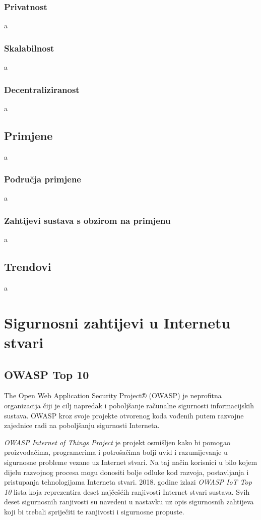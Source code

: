 \documentclass[times, utf8, diplomski]{fer}
\begin{document}
\subsection{Privatnost}
a

\subsection{Skalabilnost}
a

\subsection{Decentraliziranost}
a

\section{Primjene}
a

\subsection{Područja primjene}
a

\subsection{Zahtijevi sustava s obzirom na primjenu}
a

\section{Trendovi}
a


\chapter{Sigurnosni zahtijevi u Internetu stvari}

\section{OWASP Top 10}
The Open Web Application Security Project® (OWASP) je neprofitna organizacija čiji je cilj napredak i poboljšanje računalne sigurnosti informacijskih sustava. OWASP kroz svoje projekte otvorenog koda vođenih putem razvojne zajednice radi na poboljšanju sigurnosti Interneta.

\emph{OWASP Internet of Things Project} je projekt osmišljen kako bi pomogao proizvođačima, programerima i potrošačima bolji uvid i razumijevanje u sigurnosne probleme vezane uz Internet stvari. Na taj način korisnici u bilo kojem dijelu razvojnog procesa mogu donositi bolje odluke kod razvoja, postavljanja i pristupanja tehnologijama Interneta stvari.\citep{owasp1} 2018. godine izlazi \emph{OWASP IoT Top 10} lista koja reprezentira deset najčešćih ranjivosti Internet stvari sustava. Svih deset sigurnosnih ranjivosti su navedeni u nastavku uz opis sigurnosnih zahtijeva koji bi trebali spriječiti te ranjivosti i sigurnosne propuste. 
\end{document}
